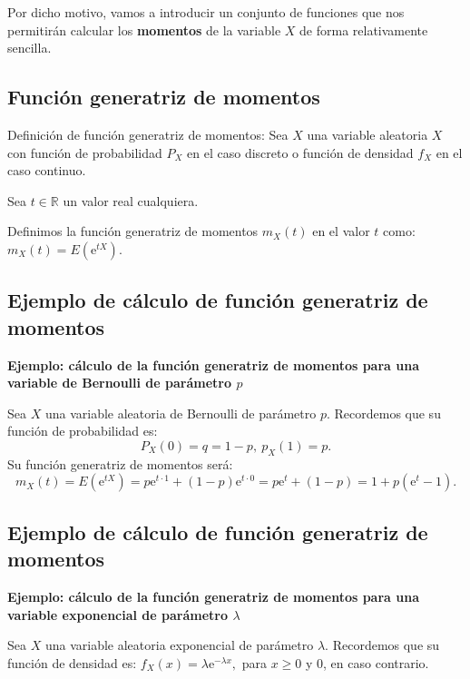 \documentclass[]{book}
\begin{document}
Por dicho motivo, vamos a introducir un conjunto de funciones que nos permitirán calcular los \textbf{momentos} de la variable \(X\) de forma relativamente sencilla.

\hypertarget{funciuxf3n-generatriz-de-momentos}{%
\subsection{Función generatriz de momentos}\label{funciuxf3n-generatriz-de-momentos}}

Definición de función generatriz de momentos:
Sea \(X\) una variable aleatoria \(X\) con función de probabilidad \(P_X\) en el caso discreto o función
de densidad \(f_X\) en el caso continuo.

Sea \(t\in\mathbb{R}\) un valor real cualquiera.

Definimos la función generatriz de momentos \(m_X(t)\) en el valor \(t\) como: \(m_X(t)=E\left(\mathrm{e}^{tX}\right).\)

\hypertarget{ejemplo-de-cuxe1lculo-de-funciuxf3n-generatriz-de-momentos}{%
\subsection{Ejemplo de cálculo de función generatriz de momentos}\label{ejemplo-de-cuxe1lculo-de-funciuxf3n-generatriz-de-momentos}}

\textbf{Ejemplo: cálculo de la función generatriz de momentos para una variable de Bernoulli de parámetro \(p\)}

Sea \(X\) una variable aleatoria de Bernoulli de parámetro \(p\). Recordemos que su función de probabilidad es:
\[
P_X(0)=q=1-p,\ p_X(1)=p.
\]
Su función generatriz de momentos será:
\[
m_X (t)=E\left(\mathrm{e}^{tX}\right) =p\mathrm{e}^{t\cdot 1}+(1-p)\mathrm{e}^{t\cdot 0}=p\mathrm{e}^t+(1-p)=1+p\left(\mathrm{e}^t -1 \right).
\]

\hypertarget{ejemplo-de-cuxe1lculo-de-funciuxf3n-generatriz-de-momentos-1}{%
\subsection{Ejemplo de cálculo de función generatriz de momentos}\label{ejemplo-de-cuxe1lculo-de-funciuxf3n-generatriz-de-momentos-1}}

\textbf{Ejemplo: cálculo de la función generatriz de momentos para una variable exponencial de parámetro \(\lambda\)}

Sea \(X\) una variable aleatoria exponencial de parámetro \(\lambda\). Recordemos que su función de densidad es: \(f_X(x)=\lambda \mathrm{e}^{-\lambda x},\) para \(x\geq 0\) y \(0\), en caso contrario.
\end{document}
